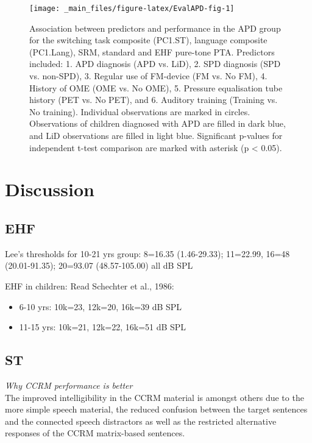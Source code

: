 \documentclass[a4paper, twoside]{templates/ociamthesis}
\begin{document}
\begin{figure}

{\centering \texttt{[image: \_main\_files/figure-latex/EvalAPD-fig-1]} 

}

\caption{Association between predictors and performance in the APD group for the switching task composite (PC1.ST), language composite (PC1.Lang), SRM, standard and EHF pure-tone PTA. Predictors included: 1. APD diagnosis (APD vs. LiD), 2. SPD diagnosis (SPD vs. non-SPD), 3. Regular use of FM-device (FM vs. No FM), 4. History of OME (OME vs. No OME), 5. Pressure equalisation tube history (PET vs. No PET), and 6. Auditory training (Training vs. No training). Individual observations are marked in circles. Observations of children diagnosed with APD are filled in dark blue, and LiD observations are filled in light blue. Significant p-values for independent t-test comparison are marked with asterisk (p < 0.05).}\label{fig:EvalAPD-fig}
\end{figure}

\newpage

\hypertarget{discussion-4}{%
\section{Discussion}\label{discussion-4}}

\hypertarget{ehf}{%
\subsection{EHF}\label{ehf}}

Lee's thresholds for 10-21 yrs group: 8=16.35 (1.46-29.33); 11=22.99, 16=48 (20.01-91.35); 20=93.07 (48.57-105.00) all dB SPL

EHF in children: Read Schechter et al., 1986:

\begin{itemize}
\item
  6-10 yrs: 10k=23, 12k=20, 16k=39 dB SPL
\item
  11-15 yrs: 10k=21, 12k=22, 16k=51 dB SPL
\end{itemize}

\hypertarget{st-2}{%
\subsection{ST}\label{st-2}}

\colorbox[HTML]{CCCCFF}{\emph{Why CCRM performance is better}}\\
The improved intelligibility in the CCRM material is amongst others due to the more simple speech material, the reduced confusion between the target sentences and the connected speech distractors as well as the restricted alternative responses of the CCRM matrix-based sentences.
\end{document}
